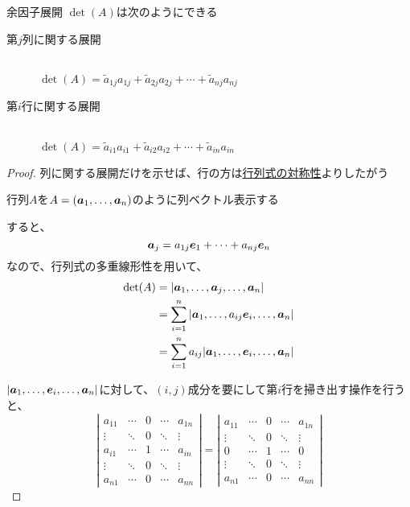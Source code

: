 \documentclass[../../../topic_linear-algebra]{subfiles}
\begin{document}
\begin{theorem*}{余因子展開}
  $\det(A)$は次のようにできる
  \begin{description}
    \item[第$j$列に関する展開]~\\ $\det(A) = \tilde{a}_{1j} a_{1j} + \tilde{a}_{2j} a_{2j} + \cdots + \tilde{a}_{nj} a_{nj}$
    \item[第$i$行に関する展開]~\\ $\det(A) = \tilde{a}_{i1} a_{i1} + \tilde{a}_{i2} a_{i2} + \cdots + \tilde{a}_{in} a_{in}$
  \end{description}
\end{theorem*}

\begin{proof}
  列に関する展開だけを示せば、行の方は\hyperref[thm:determinant-transpose-invariance]{行列式の対称性}よりしたがう

  \br

  行列$A$を$A = (\vb*{a}_1, \ldots, \vb*{a}_n)$のように列ベクトル表示する

  すると、
  \begin{equation*}
    \vb*{a}_j = a_{1j} \vb*{e}_1 + \cdots + a_{nj} \vb*{e}_n
  \end{equation*}
  なので、行列式の多重線形性を用いて、
  \begin{align*}
    \det(A) & = | \vb*{a}_1, \ldots, \vb*{a}_j, \ldots, \vb*{a}_n |                       \\
            & = \sum_{i=1}^{n} | \vb*{a}_1, \ldots, a_{ij} \vb*{e}_i, \ldots, \vb*{a}_n | \\
            & = \sum_{i=1}^{n} a_{ij} | \vb*{a}_1, \ldots, \vb*{e}_i, \ldots, \vb*{a}_n |
  \end{align*}

  $| \vb*{a}_1, \ldots, \vb*{e}_i, \ldots, \vb*{a}_n |$に対して、$(i,j)$成分を要にして第$i$行を掃き出す操作を行うと、
  \begin{equation*}
    \left| \begin{matrix}
      a_{11} & \cdots & 0 & \cdots & a_{1n} \\
      \vdots & \ddots & 0 & \ddots & \vdots \\
      a_{i1} & \cdots & 1 & \cdots & a_{in} \\
      \vdots & \ddots & 0 & \ddots & \vdots \\
      a_{n1} & \cdots & 0 & \cdots & a_{nn}
    \end{matrix} \right| = \left| \begin{matrix}
      a_{11} & \cdots & 0 & \cdots & a_{1n} \\
      \vdots & \ddots & 0 & \ddots & \vdots \\
      0      & \cdots & 1 & \cdots & 0      \\
      \vdots & \ddots & 0 & \ddots & \vdots \\
      a_{n1} & \cdots & 0 & \cdots & a_{nn}
    \end{matrix} \right|
  \end{equation*}


\end{proof}
\end{document}
